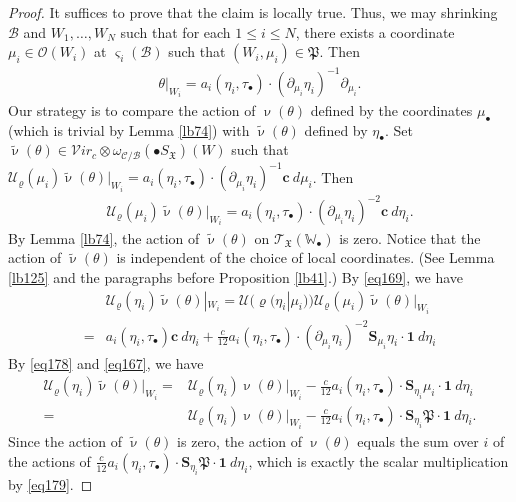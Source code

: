 \documentclass[12pt,b5paper,notitlepage]{report}
\theoremstyle{definition}
\theoremstyle{plain}
\newcommand{\fk}{\mathfrak}
\newcommand{\mc}{\mathcal}
\newcommand{\wtd}{\widetilde}
\newcommand{\id}{\mathbf{1}}
\newcommand{\scr}{\mathscr}
\newcommand{\sgm}{\varsigma}
\newcommand{\blt}{\bullet}
\newcommand{\Wbb}{\mathbb W}
\newcommand{\cbf}{\mathbf c}
\newcommand{\svir}{\mathcal V\!\mathit{ir}}
\newcommand{\Sbf}{\mathbf{S}}
\numberwithin{equation}{section}
\begin{document}
\begin{proof}
It suffices to prove that the claim is locally true. Thus, we may shrinking $\mc B$ and $W_1,\dots,W_N$ such  that for each $1\leq i\leq N$, there exists a coordinate  $\mu_i\in\scr O(W_i)$ at $\sgm_i(\mc B)$ such that $(W_i,\mu_i)\in\fk P$. Then
\begin{align*}
\theta|_{W_i}=a_i(\eta_i,\tau_\blt)\cdot(\partial_{\mu_i}\eta_i)^{-1}\partial_{\mu_i}.
\end{align*}
Our strategy is to compare the action of $\upnu(\theta)$ defined by the coordinates $\mu_\blt$ (which is trivial by Lemma \ref{lb74}) with $\wtd \upnu(\theta)$ defined by $\eta_\blt$. Set $\wtd\upnu(\theta)\in \svir_c\otimes \omega_{\mc C/\mc B}(\blt S_{\fk X})(W)$ such that $\mc U_\varrho(\mu_i)\wtd\upnu(\theta)|_{W_i}=a_i(\eta_i,\tau_\blt)\cdot(\partial_{\mu_i}\eta_i)^{-1}\cbf~d{\mu_i}$. Then
\begin{align*}
\mc U_\varrho(\mu_i)\wtd\upnu(\theta)|_{W_i}=a_i(\eta_i,\tau_\blt)\cdot(\partial_{\mu_i}\eta_i)^{-2}\cbf~d{\eta_i}.
\end{align*}
By Lemma \ref{lb74}, the action of $\wtd\upnu(\theta)$ on $\scr T_{\fk X}(\Wbb_\blt)$ is zero. Notice that the action of $\wtd\upnu(\theta)$ is independent of the choice of local coordinates. (See Lemma \ref{lb125} and the paragraphs before Proposition \ref{lb41}.) By \eqref{eq169}, we have
\begin{align*}
&\mc U_\varrho(\eta_i)\wtd\upnu(\theta)|_{W_i}=\mc U(\varrho(\eta_i|\mu_i))\mc U_\varrho(\mu_i)\wtd\upnu(\theta)|_{W_i}\\
=&a_i(\eta_i,\tau_\blt)\cbf~d{\eta_i}+\frac{c}{12} a_i(\eta_i,\tau_\blt)\cdot(\partial_{\mu_i}\eta_i)^{-2}\Sbf_{\mu_i}\eta_i\cdot \id~d{\eta_i}
\end{align*}
By \eqref{eq178} and \eqref{eq167}, we have
\begin{align*}
\mc U_\varrho(\eta_i)\wtd\upnu(\theta)|_{W_i}=&\mc U_\varrho(\eta_i)\upnu(\theta)|_{W_i}-\frac{c}{12} a_i(\eta_i,\tau_\blt)\cdot\Sbf_{\eta_i}\mu_i\cdot \id~d{\eta_i}\\
=&\mc U_\varrho(\eta_i)\upnu(\theta)|_{W_i}-\frac{c}{12} a_i(\eta_i,\tau_\blt)\cdot\Sbf_{\eta_i}\fk P\cdot \id~d{\eta_i}.
\end{align*}
Since the action of $\wtd\upnu(\theta)$ is zero, the action of $\upnu(\theta)$ equals the sum over $i$ of the actions of $\frac{c}{12} a_i(\eta_i,\tau_\blt)\cdot\Sbf_{\eta_i}\fk P\cdot \id~d{\eta_i}$, which is exactly the scalar multiplication by \eqref{eq179}.
\end{proof}
\end{document}

